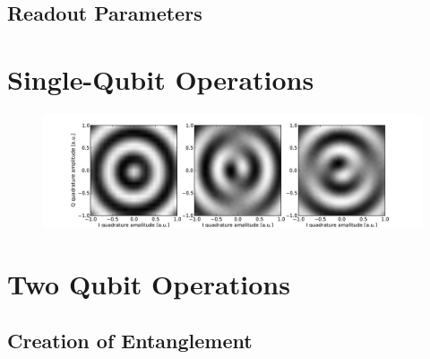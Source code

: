 \subsection{Readout Parameters}


\section{Single-Qubit Operations}




\begin{figure}
	\centering
		\includegraphics[width=1.\textwidth]{"./data/ct5/2010_12_01 - iq tomography/iq_tomographies"}
	\label{fig:SingleQubitIQControl}
	\caption{}
\end{figure}

%

\section{Two Qubit Operations}

\subsection{Creation of Entanglement}

